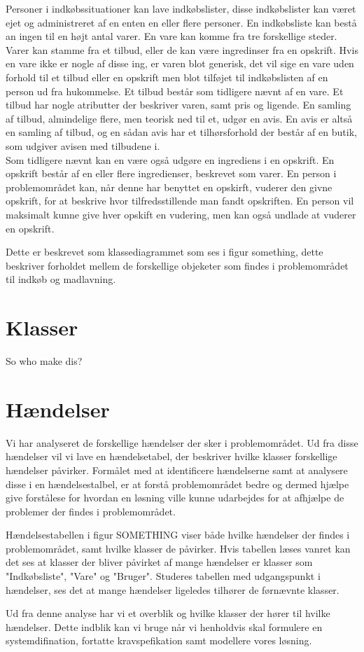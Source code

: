 Personer i indkøbssituationer kan lave indkøbslister, disse indkøbslister kan været ejet og administreret af en enten en eller flere personer. 
En indkøbsliste kan bestå an ingen til en højt antal varer.
En vare kan komme fra tre forskellige steder.
Varer kan stamme fra et tilbud, eller de kan være ingredinser fra en opskrift. 
Hvis en vare ikke er nogle af disse ing, er varen blot generisk, det vil sige en vare uden forhold til et tilbud eller en opskrift men blot tilføjet til indkøbslisten af en person ud fra hukommelse.
Et tilbud består som tidligere nævnt af en vare.
Et tilbud har nogle atributter der beskriver varen, samt pris og ligende.
En samling af tilbud, almindelige flere, men teorisk ned til et, udgør en avis. 
En avis er altså en samling af tilbud, og en sådan avis har et tilhørsforhold der består af en butik, som udgiver avisen med tilbudene i.\\
Som tidligere nævnt kan en være også udgøre en ingrediens i en opskrift.
En opskrift består af en eller flere ingredienser, beskrevet som varer.
En person i problemområdet kan, når denne har benyttet en opskirft, vuderer den givne opskrift, for at beskrive hvor tilfredsstillende man fandt opskriften.
En person vil maksimalt kunne give hver opskift en vudering, men kan også undlade at vuderer en opskrift.

Dette er beskrevet som klassediagrammet som ses i figur something, dette beskriver forholdet mellem de forskellige objeketer som findes i problemområdet til indkøb og madlavning.

\section{Klasser}
So who make dis?

\section{Hændelser}
Vi har analyseret de forskellige hændelser der sker i problemområdet. 
Ud fra disse hændelser vil vi lave en hændelsetabel, der beskriver hvilke klasser forskellige hændelser påvirker.
Formålet med at identificere hændelserne samt at analysere disse i en hændelsestalbel, er at forstå problemområdet bedre og dermed hjælpe give forstålese for hvordan en løsning ville kunne udarbejdes for at afhjælpe de problemer der findes i problemområdet.



Hændelsestabellen i figur SOMETHING viser både hvilke hændelser der findes i problemområdet, samt hvilke klasser de påvirker.
Hvis tabellen læses vanret kan det ses at klasser der bliver påvirket af mange hændelser er klasser som "Indkøbsliste", "Vare" og "Bruger".
Studeres tabellen med udgangspunkt i hændelser, ses det at mange hændelser ligeledes tilhører de førnævnte klasser.



Ud fra denne analyse har vi et overblik og hvilke klasser der hører til hvilke hændelser.
Dette indblik kan vi bruge når vi henholdvis skal formulere en systemdifination, fortatte kravspefikation samt modellere vores løsning. 
